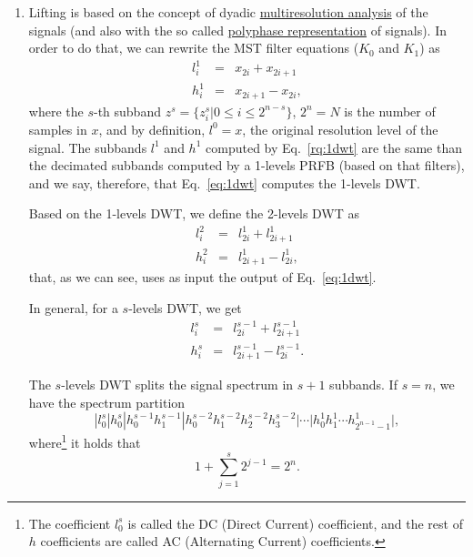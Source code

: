 \begin{enumerate}
\item Lifting is based on the concept of dyadic
  \href{https://en.wikipedia.org/wiki/Multiresolution_analysis}{multiresolution
    analysis} of the signals (and also with the so called
  \href{https://en.wikipedia.org/wiki/Polyphase_matrix}{polyphase
    representation} of signals). In order to do that, we can rewrite
  the MST filter equations ($K_0$ and $K_1$) as
  \begin{equation}
    \begin{array}{rcl}
      l^1_i & = & x_{2i} + x_{2i+1} \\
      h^1_i & = & x_{2i+1} - x_{2i},
    \end{array}
    \label{eq:1dwt}
  \end{equation}
  where the $s$-th subband $z^s=\{z_i^s|0\le i\le 2^{n-s}\}$, $2^n=N$ is the
  number of samples in $x$, and by definition, $l^0=x$, the original
  resolution level of the signal. The subbands $l^1$ and $h^1$
  computed by Eq.~\ref{rq:1dwt} are the same than the decimated
  subbands computed by a 1-levels PRFB (based on that filters), and we
  say, therefore, that Eq.~\ref{eq:1dwt} computes the 1-levels DWT.

  Based on the 1-levels DWT, we define the 2-levels DWT as
  \begin{equation}
    \begin{array}{rcl}
      l^2_i & = & l^1_{2i} + l^1_{2i+1} \\
      h^2_i & = & l^1_{2i+1} - l^1_{2i},
    \end{array}
    \label{eq:2dwt}
  \end{equation}
  that, as we can see, uses as input the output of Eq.~\ref{eq:1dwt}.

  In general, for a $s$-levels DWT, we get
    \begin{equation}
    \begin{array}{rcl}
      l^s_i & = & l^{s-1}_{2i} + l^{s-1}_{2i+1} \\
      h^s_i & = & l^{s-1}_{2i+1} - l^{s-1}_{2i}.
    \end{array}
    \label{eq:2dwt}
  \end{equation}

  The $s$-levels DWT splits the signal spectrum in $s+1$ subbands. If
  $s=n$, we have the spectrum partition
  \begin{equation*}
    | l^s_0 | h^s_0 | h^{s-1}_0 h^{s-1}_1 | h^{s-2}_0 h^{s-2}_1 h^{s-2}_2 h^{s-2}_3 | \cdots | h^1_0 h^1_1 \cdots h^1_{2^{n-1}-1} |,
  \end{equation*}
  where\footnote{The coefficient $l^s_0$ is called the DC (Direct
    Current) coefficient, and the rest of $h$ coefficients are called
    AC (Alternating Current) coefficients.} it holds that
  \begin{equation}
    1+\sum_{j=1}^s 2^{j-1}=2^n.
  \end{equation}


\end{enumerate}
